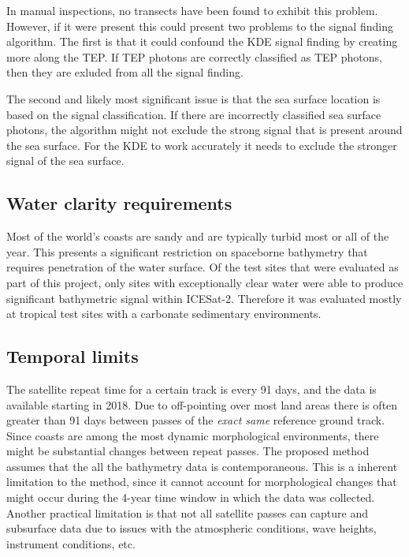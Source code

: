 In manual inspections, no transects have been found to exhibit this problem. However, if it were present this could present two problems to the signal finding algorithm. The first is that it could confound the KDE signal finding by creating more along the TEP. If TEP photons are correctly classified as TEP photons, then they are exluded from all the signal finding. 

The second and likely most significant issue is that the sea surface location is based on the signal classification. If there are incorrectly classified sea surface photons, the algorithm might not exclude the strong signal that is present around the sea surface. For the KDE to work accurately it needs to exclude the stronger signal of the sea surface. 

\subsection{Water clarity requirements}

Most of the world's coasts are sandy and are typically turbid most or all of the year. This presents a significant restriction on spaceborne bathymetry that requires penetration of the water surface. Of the test sites that were evaluated as part of this project, only sites with exceptionally clear water were able to produce significant bathymetric signal within ICESat-2. Therefore it was evaluated mostly at tropical test sites with a carbonate sedimentary environments.  

\subsection{Temporal limits}

The satellite repeat time for a certain track is every 91 days, and the data is available starting in 2018. Due to off-pointing over most land areas there is often greater than 91 days between passes of the \emph{exact same} reference ground track. Since coasts are among the most dynamic morphological environments, there might be substantial changes between repeat passes. The proposed method assumes that the all the bathymetry data is contemporaneous. This is a inherent limitation to the method, since it cannot account for morphological changes that might occur during the 4-year time window in which the data was collected. Another practical limitation is that not all satellite passes can capture and subsurface data due to issues with the atmospheric conditions, wave heights, instrument conditions, etc. 

